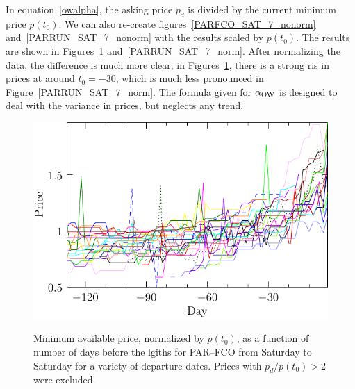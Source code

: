 \documentclass{article}
\def\aow{\alpha_{\rm{OW}}}
\begin{document}
In equation~\eqref{owalpha}, the asking price $p_d$ is divided by the
current minimum price $p(t_0)$.  We can also re-create
figures~\ref{PARFCO_SAT_7_nonorm} and~\ref{PARRUN_SAT_7_nonorm} with
the results scaled by $p(t_0)$.  The results are shown in
Figures~\ref{PARFCO_SAT_7_norm} and~\ref{PARRUN_SAT_7_norm}.  After
normalizing the data, the difference is much more clear; in
Figures~\ref{PARFCO_SAT_7_norm}, there is a strong ris in prices at
around $t_0=-30$, which is much less pronounced in
Figure~\ref{PARRUN_SAT_7_norm}.  The formula given for $\aow$ is
designed to deal with the variance in prices, but neglects any trend.
\begin{figure}
  \begin{center}
    \includegraphics{pdf/PARFCO_SAT_7_norm}
    \label{PARFCO_SAT_7_norm}
    \caption{Minimum available price, normalized by $p(t_0)$, as a
      function of number of days before the lgiths for PAR--FCO from
      Saturday to Saturday for a variety of departure dates. Prices
      with $p_d/p(t_0) > 2$ were excluded.}
  \end{center}
\end{figure}
\end{document}
